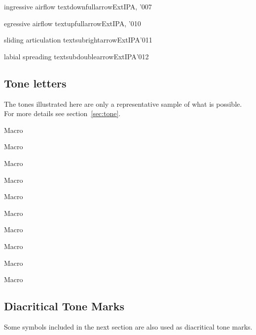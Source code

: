 %
  {ingressive airflow}%
  {\tbs textdownfullarrow}{}{ExtIPA, \Handbook}{'007}

%
  {egressive airflow}%
  {\tbs textupfullarrow}{}{ExtIPA, \Handbook}{'010}

%
  {sliding articulation}%
  {\tbs textsubrightarrow}{}{ExtIPA}{'011}

%
  {labial spreading}%
  {\tbs textsubdoublearrow}{}{ExtIPA}{'012}


\subsection{Tone letters}

The tones illustrated here are only a representative sample of what is
possible.  For more details see section~\ref{sec:tone}.

\bigskip

%
  {}%
  {}{}{\ipanew}{Macro}

%
  {}%
  {}{}{\ipanew}{Macro}

%
  {}%
  {}{}{\ipanew}{Macro}

%
  {}%
  {}{}{\ipanew}{Macro}

%
  {}%
  {}{}{\ipanew}{Macro}

%
  {}%
  {}{}{\ipanew}{Macro}

%
  {}%
  {}{}{\ipanew}{Macro}

%
  {}%
  {}{}{\ipanew}{Macro}

%
  {}%
  {}{}{\ipanew}{Macro}

%
  {}%
  {}{}{\ipanew}{Macro}


\subsection{Diacritical Tone Marks}

Some symbols included in the next section are also used as diacritical 
tone marks.

